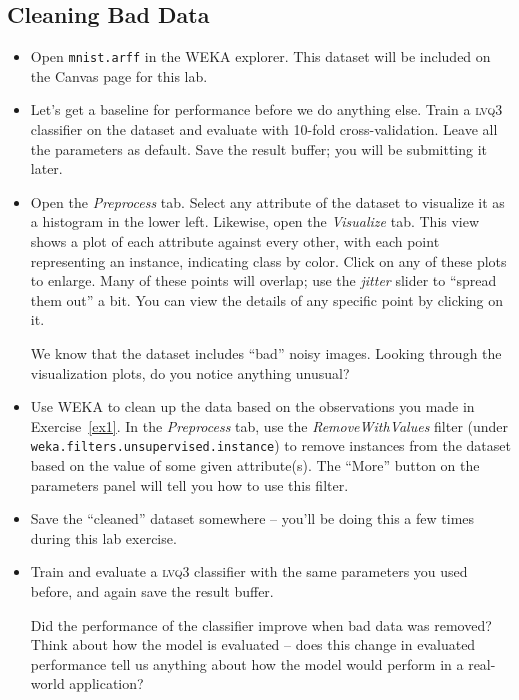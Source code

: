 \documentclass[11pt]{cselabheader}
\begin{document}
\subsection{Cleaning Bad Data}
\begin{itemize}[leftmargin=*]
  \item Open \texttt{mnist.arff} in the WEKA explorer. This dataset will be included on the Canvas page for this lab.

  \item Let's get a baseline for performance before we do anything else. Train a \textsc{lvq3} classifier on the dataset and evaluate with 10-fold cross-validation. Leave all the parameters as default. Save the result buffer; you will be submitting it later.

  \item Open the \emph{Preprocess} tab. Select any attribute of the dataset to visualize it as a histogram in the lower left. Likewise, open the \emph{Visualize} tab. This view shows a plot of each attribute against every other, with each point representing an instance, indicating class by color. Click on any of these plots to enlarge. Many of these points will overlap; use the \emph{jitter} slider to ``spread them out'' a bit. You can view the details of any specific point by clicking on it.
 
  \begin{ex}\label{ex1}
    We know that the dataset includes ``bad'' noisy images. Looking through the visualization plots, do you notice anything unusual?
  \end{ex}

  \item Use WEKA to clean up the data based on the observations you made in Exercise~\ref{ex1}. In the \emph{Preprocess} tab, use the \emph{RemoveWithValues} filter (under \texttt{weka.filters.unsupervised.instance}) to remove instances from the dataset based on the value of some given attribute(s). The ``More'' button on the parameters panel will tell you how to use this filter.

  \item Save the ``cleaned'' dataset somewhere -- you'll be doing this a few times during this lab exercise.

  \item Train and evaluate a \textsc{lvq3} classifier with the same parameters you used before, and again save the result buffer.

  \begin{ex}
    Did the performance of the classifier improve when bad data was removed? Think about how the model is evaluated -- does this change in evaluated performance tell us anything about how the model would perform in a real-world application?
  \end{ex}
\end{itemize}
\end{document}
